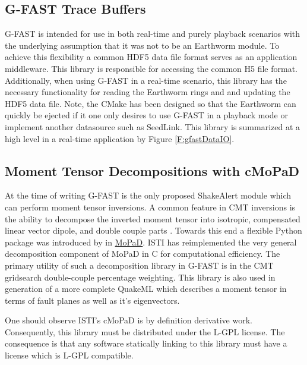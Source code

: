\documentclass[12pt]{article}
\begin{document}
\subsection{G-FAST Trace Buffers}\label{ss:gfastTraceBuffer}
G-FAST is intended for use in both real-time and purely playback scenarios with the underlying
assumption that it was not to be an Earthworm module.  To achieve this flexibility a common HDF5 
data file format serves as an application middleware.  This library is responsible for accessing
the common H5 file format.  Additionally, when using G-FAST in a real-time scenario, this library
has the necessary functionality for reading the Earthworm rings and and updating the HDF5 data file.
Note, the CMake has been designed so that the Earthworm can quickly be ejected if it one only 
desires to use G-FAST in a playback mode or implement another datasource such as SeedLink.   
This library is summarized at a high level in a real-time application by Figure \ref{F:gfastDataIO}.  

\subsection{Moment Tensor Decompositions with cMoPaD}\label{ss:gfastMopad}
At the time of writing G-FAST is the only proposed ShakeAlert module which can perform
moment tensor inversions.  A common feature in CMT inversions is the ability to decompose
the inverted moment tensor into isotropic, compensated linear vector dipole, and double
couple parts \citep[e.g.][]{jostAndHerrmann1989}.  Towards this end a flexible Python 
package was introduced by \citet{krieger} in \href{https://github.com/geophysics/MoPaD}{MoPaD}.  
ISTI has reimplemented the very general decomposition component of MoPaD in C for 
computational efficiency.  The primary utility of such a decomposition library in G-FAST is 
in the CMT gridsearch double-couple percentage weighting.  This library is also used in 
generation of a more complete QuakeML which describes a moment tensor in terms of fault planes 
as well as it's eigenvectors. 

One should observe ISTI's cMoPaD is by definition derivative work.  Consequently, this library
must be distributed under the L-GPL license.  The consequence is that any software statically
linking to this library must have a license which is L-GPL compatible.

\clearpage
\end{document}
